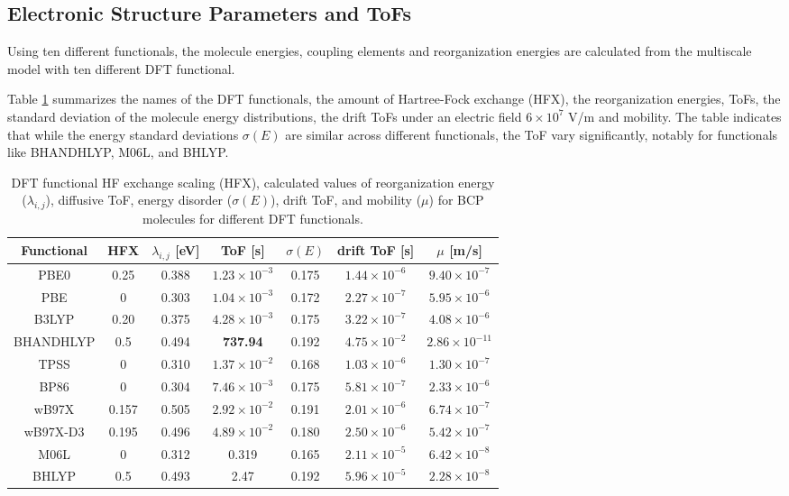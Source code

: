 \documentclass[letterpaper,12pt]{article}
\begin{document}
\subsection{Electronic Structure Parameters and ToFs}
Using ten different functionals, the molecule energies, coupling elements and reorganization energies are calculated from the multiscale model with ten different DFT functional.

Table \ref{tab:para} summarizes the names of the DFT functionals, the amount of Hartree-Fock exchange (HFX), the reorganization energies, ToFs, the standard deviation of the molecule energy distributions, the drift ToFs under an electric field $6 \times 10^7$ V/m and mobility.
The table indicates that while the energy standard deviations $\sigma(E)$ are similar across different functionals, the ToF vary significantly, notably for functionals like BHANDHLYP, M06L, and BHLYP.

\begin{table}[h]
    \centering
    \begin{tabular}{c c c c c c c}
    \hline
        Functional & HFX & $\lambda_{i,j}$ [eV] & ToF [s] & $\sigma(E)$ & drift ToF [s] & $\mu$ [m/s] \\ 
        \hline
        PBE0 & 0.25 & 0.388 & $1.23\times 10^{-3}$ & 0.175 & $1.44 \times 10^{-6}$ & $9.40\times 10^{-7}$ \\
        PBE & 0 & 0.303 & $1.04\times 10^{-3}$ & 0.172 & $2.27 \times 10^{-7}$ & $5.95 \times 10^{-6}$ \\ 
        B3LYP & 0.20 & 0.375 & $4.28\times 10^{-3}$ & 0.175  & $3.22\times 10^{-7}$ & $4.08 \times 10^{-6}$ \\
        BHANDHLYP & 0.5 & 0.494 & \textbf{737.94} & 0.192  & $4.75\times 10^{-2}$ & $2.86\times 10^{-11}$ \\
        TPSS & 0 & 0.310 & $1.37\times 10^{-2}$ & 0.168  & $1.03 \times 10^{-6}$ & $1.30\times 10^{-7}$ \\
        BP86 & 0 & 0.304 & $7.46\times 10^{-3}$ & 0.175  & $5.81 \times 10^{-7}$ & $2.33\times 10^{-6}$ \\
        wB97X & 0.157 & 0.505 & $2.92\times 10^{-2}$ & 0.191  & $2.01\times 10^{-6}$  & $6.74\times 10^{-7}$ \\
        wB97X-D3 & 0.195 & 0.496 & $4.89\times 10^{-2}$ & 0.180  & $2.50 \times 10^{-6}$ & $5.42 \times 10^{-7}$ \\
        M06L & 0 & 0.312 & 0.319 & 0.165 & $2.11 \times 10^{-5}$ & $6.42 \times 10^{-8}$ \\
        BHLYP & 0.5 & 0.493 & 2.47 & 0.192  & $5.96 \times 10^{-5}$ & $ 2.28\times 10^{-8}$  \\
    \hline
    \end{tabular}
    \caption{DFT functional HF exchange scaling (HFX), calculated values of reorganization energy ($\lambda_{i,j}$), diffusive ToF, energy disorder ($\sigma(E)$), drift ToF, and mobility ($\mu$) for BCP molecules for different DFT functionals.}
    \label{tab:para}
\end{table}
\end{document}
